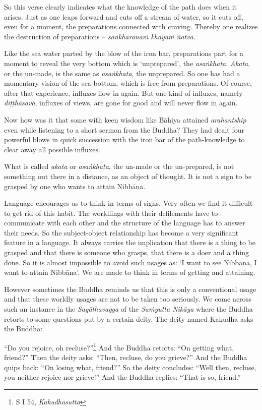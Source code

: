 So this verse clearly indicates what the knowledge of the path does when it arises. Just as one leaps forward and cuts off a stream of water, so it cuts off, even for a moment, the preparations connected with craving. Thereby one realizes the destruction of preparations -- \emph{saṅkhārānaṁ khayaṁ ñatvā}.

Like the sea water parted by the blow of the iron bar, preparations part for a moment to reveal the very bottom which is `unprepared', the \emph{asaṅkhata}. \emph{Akata}, or the un-made, is the same as \emph{asaṅkhata}, the unprepared. So one has had a momentary vision of the sea bottom, which is free from preparations. Of course, after that experience, influxes flow in again. But one kind of influxes, namely \emph{diṭṭhāsavā}, influxes of views, are gone for good and will never flow in again.

Now how was it that some with keen wisdom like Bāhiya attained \emph{arahantship} even while listening to a short sermon from the Buddha? They had dealt four powerful blows in quick succession with the iron bar of the path-knowledge to clear away all possible influxes.

What is called \emph{akata} or \emph{asaṅkhata}, the un-made or the un-prepared, is not something out there in a distance, as an object of thought. It is not a sign to be grasped by one who wants to attain Nibbāna.

Language encourages us to think in terms of signs. Very often we find it difficult to get rid of this habit. The worldlings with their defilements have to communicate with each other and the structure of the language has to answer their needs. So the subject-object relationship has become a very significant feature in a language. It always carries the implication that there is a thing to be grasped and that there is someone who grasps, that there is a doer and a thing done. So it is almost impossible to avoid such usages as: `I want to see Nibbāna, I want to attain Nibbāna'. We are made to think in terms of getting and attaining.

However sometimes the Buddha reminds us that this is only a conventional usage and that these worldly usages are not to be taken too seriously. We come across such an instance in the \emph{Sagāthavagga} of the \emph{Saṁyutta Nikāya} where the Buddha retorts to some questions put by a certain deity. The deity named Kakudha asks the Buddha:

``Do you rejoice, oh recluse?''\footnote{S I 54, \emph{Kakudhasutta}} And the Buddha retorts: ``On getting what, friend?'' Then the deity asks: ``Then, recluse, do you grieve?'' And the Buddha quips back: ``On losing what, friend?'' So the deity concludes: ``Well then, recluse, you neither rejoice nor grieve!'' And the Buddha replies: ``That is so, friend.''

